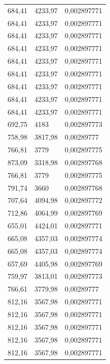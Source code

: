 \begin{center}
\begin{longtable}{|l|l|l|}
684,41            & 4233,97           & 0,002897771 \\
684,41            & 4233,97           & 0,002897771 \\
684,41            & 4233,97           & 0,002897771 \\
684,41            & 4233,97           & 0,002897771 \\
684,41            & 4233,97           & 0,002897771 \\
684,41            & 4233,97           & 0,002897771 \\
684,41            & 4233,97           & 0,002897771 \\
684,41            & 4233,97           & 0,002897771 \\
684,41            & 4233,97           & 0,002897771 \\
692,75            & 4183              & 0,002897773 \\
758,98            & 3817,98           & 0,00289777  \\
766,81            & 3779              & 0,002897775 \\
873,09            & 3318,98           & 0,002897768 \\
766,81            & 3779              & 0,002897775 \\
791,74            & 3660              & 0,002897768 \\
707,64            & 4094,98           & 0,002897772 \\
712,86            & 4064,99           & 0,002897769 \\
655,01            & 4424,01           & 0,002897771 \\
665,08            & 4357,03           & 0,002897774 \\
665,08            & 4357,03           & 0,002897774 \\
657,69            & 4405,98           & 0,002897769 \\
759,97            & 3813,01           & 0,002897773 \\
766,61            & 3779,98           & 0,00289777  \\
812,16            & 3567,98           & 0,002897771 \\
812,16            & 3567,98           & 0,002897771 \\
812,16            & 3567,98           & 0,002897771 \\
812,16            & 3567,98           & 0,002897771 \\
812,16            & 3567,98           & 0,002897771 \\

\end{longtable}
\end{center}
